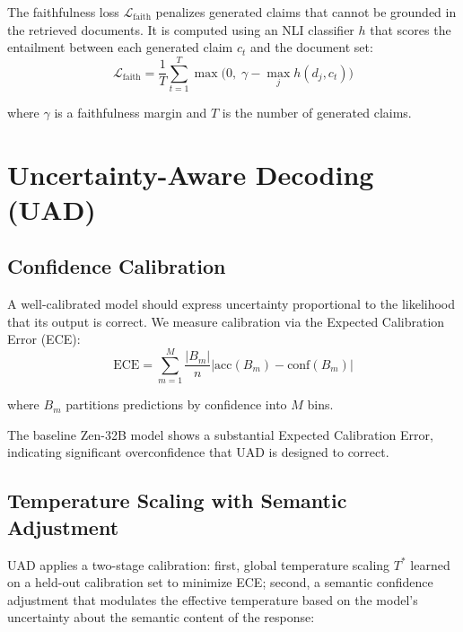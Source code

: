 \documentclass[11pt,a4paper]{article}
\begin{document}
The faithfulness loss $\mathcal{L}_{\text{faith}}$ penalizes generated claims that cannot
be grounded in the retrieved documents. It is computed using an NLI classifier $h$ that
scores the entailment between each generated claim $c_t$ and the document set:
\begin{equation}
    \mathcal{L}_{\text{faith}} = \frac{1}{T}\sum_{t=1}^{T}
    \max\!\bigl(0,\; \gamma - \max_j h(d_j, c_t)\bigr)
    \label{eq:faith_loss}
\end{equation}

where $\gamma$ is a faithfulness margin and $T$ is the number of generated claims.

\section{Uncertainty-Aware Decoding (UAD)}
\label{sec:uad}

\subsection{Confidence Calibration}

A well-calibrated model should express uncertainty proportional to the likelihood that
its output is correct. We measure calibration via the Expected Calibration Error (ECE):
\begin{equation}
    \text{ECE} = \sum_{m=1}^{M} \frac{|B_m|}{n} \left|
    \text{acc}(B_m) - \text{conf}(B_m) \right|
    \label{eq:ece}
\end{equation}

where $B_m$ partitions predictions by confidence into $M$ bins.

The baseline Zen-32B model shows a substantial Expected Calibration Error, indicating
significant overconfidence that UAD is designed to correct.

\subsection{Temperature Scaling with Semantic Adjustment}

UAD applies a two-stage calibration: first, global temperature scaling $T^*$ learned on
a held-out calibration set to minimize ECE; second, a semantic confidence adjustment that
modulates the effective temperature based on the model's uncertainty about the semantic
content of the response:
\end{document}
